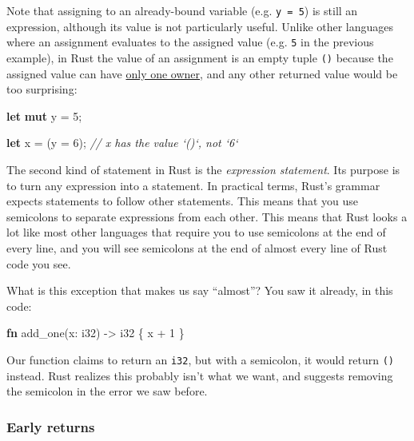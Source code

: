 \documentclass[a4paper,]{book}
\newenvironment{Shaded}{\begin{snugshade}}{\end{snugshade}}
\newcommand{\KeywordTok}[1]{\textcolor[rgb]{0.13,0.29,0.53}{\textbf{{#1}}}}
\newcommand{\DataTypeTok}[1]{\textcolor[rgb]{0.13,0.29,0.53}{{#1}}}
\newcommand{\DecValTok}[1]{\textcolor[rgb]{0.00,0.00,0.81}{{#1}}}
\newcommand{\CommentTok}[1]{\textcolor[rgb]{0.56,0.35,0.01}{\textit{{#1}}}}
\newcommand{\NormalTok}[1]{{#1}}
\begin{document}
Note that assigning to an already-bound variable (e.g. \texttt{y\ =\ 5})
is still an expression, although its value is not particularly useful.
Unlike other languages where an assignment evaluates to the assigned
value (e.g. \texttt{5} in the previous example), in Rust the value of an
assignment is an empty tuple \texttt{()} because the assigned value can
have \protect\hyperlink{sec--ownership}{only one owner}, and any other
returned value would be too surprising:

\begin{Shaded}
\begin{Highlighting}[]
\KeywordTok{let} \KeywordTok{mut} \NormalTok{y = }\DecValTok{5}\NormalTok{;}

\KeywordTok{let} \NormalTok{x = (y = }\DecValTok{6}\NormalTok{);  }\CommentTok{// x has the value `()`, not `6`}
\end{Highlighting}
\end{Shaded}

The second kind of statement in Rust is the \emph{expression statement}.
Its purpose is to turn any expression into a statement. In practical
terms, Rust's grammar expects statements to follow other statements.
This means that you use semicolons to separate expressions from each
other. This means that Rust looks a lot like most other languages that
require you to use semicolons at the end of every line, and you will see
semicolons at the end of almost every line of Rust code you see.

What is this exception that makes us say ``almost''? You saw it already,
in this code:

\begin{Shaded}
\begin{Highlighting}[]
\KeywordTok{fn} \NormalTok{add_one(x: }\DataTypeTok{i32}\NormalTok{) -> }\DataTypeTok{i32} \NormalTok{\{}
    \NormalTok{x + }\DecValTok{1}
\NormalTok{\}}
\end{Highlighting}
\end{Shaded}

Our function claims to return an \texttt{i32}, but with a semicolon, it
would return \texttt{()} instead. Rust realizes this probably isn't what
we want, and suggests removing the semicolon in the error we saw before.

\hypertarget{early-returns}{\subsubsection{Early
returns}\label{early-returns}}
\end{document}
